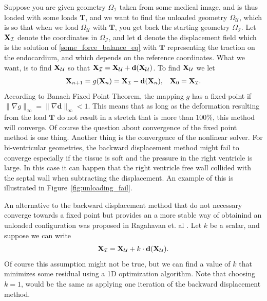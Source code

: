 Suppose you are given geometry $\Omega_{\mathcal{I}}$ taken from some medical image, and
is thus loaded with some loads $\mathbf{T}$, and we want to find the unloaded geometry
$\Omega_{\mathcal{U}}$, which is so that when we load $\Omega_{\mathcal{U}}$ with $\mathbf{T}$,
you get back the starting geometry $\Omega_{\mathcal{I}}$. Let
$\mathbf{X}_{\mathcal{I}}$ denote the coordinates in $\Omega_{\mathcal{I}}$, and
let $\mathbf{d}$ denote the displacement field which is the solution
of \eqref{some_force_balance_eq} with $\mathbf{T}$ representing
the traction on the endocardium, and which depends on the reference
coordinates. What we want, is to find
$\mathbf{X}_{\mathcal{U}}$ so that $\mathbf{X}_{\mathcal{I}} =
\mathbf{X}_{\mathcal{U}} + \mathbf{d}(\mathbf{X}_{\mathcal{U}})$. To
find  $\mathbf{X}_{\mathcal{U}}$ we let
\begin{align}
  \mathbf{X}_{n+1} = g(\mathbf{X}_n) =  \mathbf{X}_{\mathcal{I}} - \mathbf{d}(\mathbf{X}_n),
  && \mathbf{X}_0 = \mathbf{X}_{\mathcal{I}}.
\end{align}
According to Banach Fixed Point Theorem, the mapping $g$ has a
fixed-point if $\| \nabla g \|_{\infty} = \| \nabla \mathbf{d}
\|_{\infty} < 1$. This means that as long as the deformation
resulting from the load $\mathbf{T}$ do not result in a stretch that
is more than $100 \%$, this method will converge. Of course the
question about convergence of the fixed point method is one
thing. Another thing is the convergence of the nonlinear solver.
For bi-ventricular geometries, the backward displacement method might
fail to converge especially if the tissue is soft and the pressure in
the right ventricle is large. In this case it can happen that the
right ventricle free wall collided with the septal wall when
subtracting the displacement. An example of this is illustrated in
Figure~\ref{fig:unloading_fail}. 

An alternative to the backward displacement method that do not
necessary converge towards a fixed point but provides an a more stable
way of obtainind an unloaded configuration was proposed in Ragahavan
et. al \cite{raghavan2006non}. Let $k$ be a scalar, and suppose we can write
\begin{align}
  \mathbf{X}_{\mathcal{I}} = \mathbf{X}_{\mathcal{U}} + k \cdot \mathbf{d}(\mathbf{X}_{\mathcal{U}}).
\end{align}
Of course this assumption might not be true, but we can find a value of
$k$ that minimizes some residual using a 1D optimization
algorithm. Note that choosing $k = 1$, would be the same as applying
one iteration of the backward displacement method.

